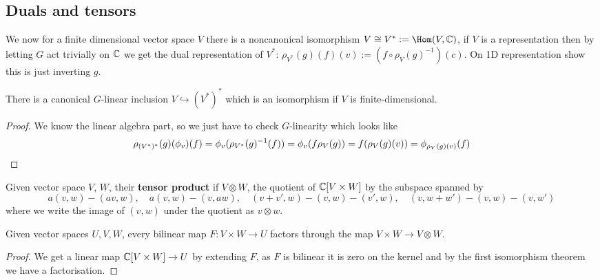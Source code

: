 \documentclass{article}
\begin{document}
\subsection{Duals and tensors}

We now for a finite dimensional vector space $V$ there is a noncanonical isomorphism $V\cong V^* := \Hom(V,\bC)$, if $V$ is a representation then by letting $G$ act trivially on $\mathbb{C}$ we get the dual representation of $V^*$: $\rho_{V^*}(g)(f)(v) := (f\circ\rho_V(g)^{-1})(c)$. On 1D representation show this is just inverting $g$.

\begin{proposition}
    There is a canonical $G$-linear inclusion $V\hookrightarrow (V^*)^*$ which is an isomorphism if $V$ is finite-dimensional.
    \begin{proof}
        We know the linear algebra part, so we just have to check $G$-linearity which looks like \[
        \rho_{(V^*)^*}(g)(\phi_v)(f) = \phi_v(\rho_{V^*}(g)^{-1}(f)) = \phi_v(f\rho_V(g)) = f(\rho_V(g)(v)) = \phi_{\rho_V(g)(v)}(f)\qedhere
        \]
    \end{proof}
\end{proposition}

\begin{definition}
    Given vector space $V$, $W$, their \textbf{tensor product} if $V\otimes W$, the quotient of $\mathbb{C}[V\times W]$ by the subspace spanned by \[
    a(v,w) - (av,w), \quad a(v,w) - (v,aw), \quad (v+v',w) - (v,w) - (v',w), \quad (v,w+w') - (v,w) - (v,w')
    \] where we write the image of $(v,w)$ under the quotient as $v\otimes w$.
\end{definition}

\begin{proposition}
    Given vector spaces $U,V,W$, every bilinear map $F:V\times W\rightarrow U$ factors through the map $V\times W\rightarrow V\otimes W$.\begin{proof}
        We get a linear map $\mathbb{C}[V\times W]\rightarrow U$ by extending $F$, as $F$ is bilinear it is zero on the kernel and by the first isomorphism theorem we have a factorisation.
    \end{proof}
\end{proposition}
\end{document}
